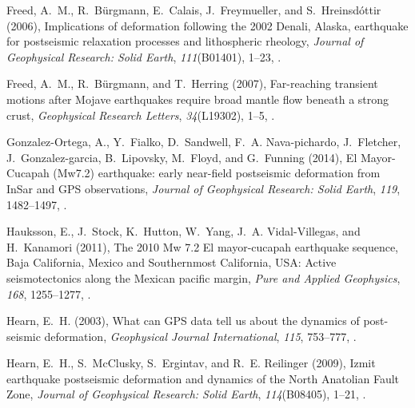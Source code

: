 \documentclass[draft,linenumbers]{AGUJournal}
\begin{document}
\begin{thebibliography}{52}
Freed, A.~M., R.~B{\"{u}}rgmann, E.~Calais, J.~Freymueller, and S.~Hreinsd{\'{o}}ttir (2006), {Implications of deformation following the 2002 Denali, Alaska, earthquake for postseismic relaxation processes and lithospheric rheology}, \textit{Journal of Geophysical Research: Solid Earth}, \textit{111}(B01401), 1--23, .

Freed, A.~M., R.~B{\"{u}}rgmann, and T.~Herring (2007), {Far-reaching transient motions after Mojave earthquakes require broad mantle flow beneath a strong crust}, \textit{Geophysical Research Letters}, \textit{34}(L19302), 1--5, .

Gonzalez-Ortega, A., Y.~Fialko, D.~Sandwell, F.~A. Nava-pichardo, J.~Fletcher, J.~Gonzalez-garcia, B.~Lipovsky, M.~Floyd, and G.~Funning (2014), {El Mayor-Cucapah (Mw7.2) earthquake: early near-field postseismic deformation from InSar and GPS observations}, \textit{Journal of Geophysical Research: Solid Earth}, \textit{119}, 1482--1497, .

Hauksson, E., J.~Stock, K.~Hutton, W.~Yang, J.~A. Vidal-Villegas, and H.~Kanamori (2011), {The 2010 Mw 7.2 El mayor-cucapah earthquake sequence, Baja California, Mexico and Southernmost California, USA: Active seismotectonics along the Mexican pacific margin}, \textit{Pure and Applied Geophysics}, \textit{168}, 1255--1277, .

Hearn, E.~H. (2003), {What can GPS data tell us about the dynamics of post-seismic deformation}, \textit{Geophysical Journal International}, \textit{115}, 753--777, .

Hearn, E.~H., S.~McClusky, S.~Ergintav, and R.~E. Reilinger (2009), {Izmit earthquake postseismic deformation and dynamics of the North Anatolian Fault Zone}, \textit{Journal of Geophysical Research: Solid Earth}, \textit{114}(B08405), 1--21, .


\end{thebibliography}
\end{document}
